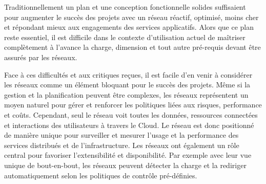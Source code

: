 
Traditionnellement un plan et une conception fonctionnelle solides suffisaient pour augmenter le succès des projets avec un réseau réactif, optimisé, moins cher et répondant mieux aux engagements des services applicatifs. Alors que ce plan reste essentiel, il est difficile dans le contexte d'utilisation actuel de maîtriser complètement  à l'avance la charge, dimension et tout autre pré-requis devant être assurés par les réseaux.

Face à ces difficultés et aux critiques reçues, il est facile d'en venir à considérer les réseaux comme un élément bloquant pour le succès des projets. Même si la gestion et la planification peuvent être complexes, les réseaux représentent un moyen naturel pour gérer et renforcer les politiques liées aux risques, performance et coûts. Cependant, seul le réseau voit toutes les données, ressources connectées et interactions des utilisateurs à travers le Cloud. Le réseau est donc positionné de manière unique pour surveiller et mesurer l'usage et la performance des services distribués et de l'infrastructure. Les réseaux ont également un rôle central pour favoriser l'extensibilité et disponibilité. Par exemple avec leur vue unique de bout-en-bout, les réseaux peuvent détecter la charge et la rediriger automatiquement selon les politiques de contrôle pré-définies.

